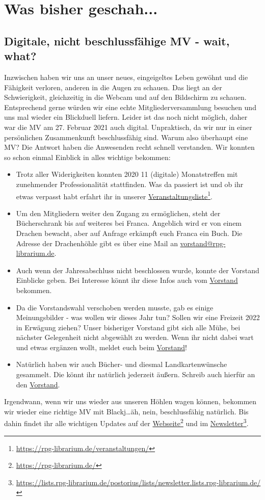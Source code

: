 \documentclass[final]{multiversum}
\newcommand\fnref[2]{\href{#1}{#2}\footnote{\url{#1}}}
\begin{document}
\makemultititle
%

\section{Was bisher geschah...}

\subsection{Digitale, nicht beschlussfähige MV - wait, what?}
Inzwischen haben wir uns an unser neues, eingeigeltes Leben gewöhnt und die Fähigkeit verloren, anderen in die Augen zu schauen.
Das liegt an der Schwierigkeit, gleichzeitig in die Webcam und auf den Bildschirm zu schauen.
Entsprechend gerne würden wir eine echte Mitgliederversammlung besuchen und uns mal wieder ein Blickduell liefern. 
Leider ist das noch nicht möglich, daher war die MV am 27. Februar 2021 auch digital. 
Unpraktisch, da wir nur in einer persönlichen Zusammenkunft beschlussfähig sind.
Warum also überhaupt eine MV?
Die Antwort haben die Anwesenden recht schnell verstanden.
Wir konnten so schon einmal Einblick in alles wichtige bekommen:
\begin{itemize}
\item Trotz aller Widerigkeiten konnten 2020 11 (digitale) Monatstreffen mit zunehmender Professionalität stattfinden.
Was da passiert ist und ob ihr etwas verpasst habt erfahrt ihr in unserer \fnref{https://rpg-librarium.de/veranstaltungen/}{Veranstaltungsliste}.
\item Um den Mitgliedern weiter den Zugang zu ermöglichen, steht der Bücherschrank bis auf weiteres bei Franca. 
Angeblich wird er von einem Drachen bewacht, aber auf Anfrage erkämpft euch Franca ein Buch. 
Die Adresse der Drachenhöhle gibt es über eine Mail an \href{mailto:vorstand@rpg-librarium.de}{vorstand@rpg-librarium.de}.
\item Auch wenn der Jahresabschluss nicht beschlossen wurde, konnte der Vorstand Einblicke geben. 
Bei Interesse könnt ihr diese Infos auch vom \href{mailto:vorstand@rpg-librarium.de}{Vorstand} bekommen.
\item Da die Vorstandswahl verschoben werden musste, gab es einige Meinungsbilder - was wollen wir dieses Jahr tun? 
Sollen wir eine Freizeit 2022 in Erwägung ziehen? 
Unser bisheriger Vorstand gibt sich alle Mühe, bei nächster Gelegenheit nicht abgewählt zu werden. 
Wenn ihr nicht dabei wart und etwas ergänzen wollt, meldet euch beim \href{mailto:vorstand@rpg-librarium.de}{Vorstand}!
\item Natürlich haben wir auch Bücher- und diesmal Landkartenwünsche gesammelt.
Die könnt ihr natürlich jederzeit äußern. Schreib auch hierfür an den \href{mailto:vorstand@rpg-librarium.de}{Vorstand}.
\end{itemize}
Irgendwann, wenn wir uns wieder aus unseren Höhlen wagen können, bekommen wir wieder eine richtige MV mit Blackj\dots äh, nein, beschlussfähig natürlich. 
Bis dahin findet ihr alle wichtigen Updates auf der \fnref{https://rpg-librarium.de/}{Webseite} und im \fnref{https://lists.rpg-librarium.de/postorius/lists/newsletter.lists.rpg-librarium.de/}{Newsletter}.
\end{document}
